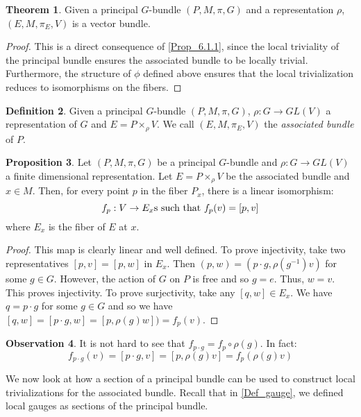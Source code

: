\documentclass[12pt,a4paper]{report}
\theoremstyle{definition}
\newtheorem{Def}{Definition}[chapter]
\theoremstyle{Theorem}
\newtheorem{Theo}[Def]{Theorem}
\newtheorem{Prop}[Def]{Proposition}
\theoremstyle{definition}
\theoremstyle{definition}
\newtheorem{Obs}[Def]{Observation}
\begin{document}
	\begin{Theo}
		Given a principal $G$-bundle $(P,M,\pi,G)$ and a representation $\rho$, $(E,M,\pi_E,V)$ is a vector bundle.
	\end{Theo}
	\begin{proof}
		\begin{comment}
			The proof follows from proposition \ref{Prop_6.1.1}. In fact the principal bundle is locally trivial and this implies that the associated bundle is locally trivial as well, with fiber $V$
		\end{comment}
		This is a direct consequence of \ref{Prop_6.1.1}, since the local triviality of the principal bundle ensures the associated bundle to be locally trivial. Furthermore, the structure of $\phi$ defined above ensures that the local trivialization reduces to isomorphisms on the fibers.
	\end{proof}
	\begin{Def}
		Given a principal $G$-bundle $(P,M,\pi,G)$, $\rho:G\rightarrow GL(V)$ a representation of $G$ and $E=P\times_\rho V$. We call $(E,M,\pi_E,V)$ the \textit{associated bundle} of $P$.
	\end{Def}
	\begin{Prop}\label{Prop_6.2.2}
		Let $(P,M,\pi,G)$ be a principal $G$-bundle and $\rho:G\rightarrow GL(V)$ a finite dimensional representation. Let $E=P\times_\rho V$ be the associated bundle and $x\in M$. Then, for every point $p$ in the fiber $P_x$, there is a linear isomorphism:
		$$f_p:V\rightarrow E_x \hbox{s such that }f_p(v)=[p,v]$$ 
		where $E_x$ is the fiber of $E$ at $x$.
	\end{Prop}
	\begin{proof}
		This map is clearly linear and well defined. To prove injectivity, take two representatives $[p,v]=[p,w]$ in $E_x$. Then $(p,w)=(p\cdot g,\rho(g^{-1})v)$ for some $g\in G$. However, the action of $G$ on $P$ is free and so $g=e$. Thus, $w=v$. This proves injectivity. To prove surjectivity, take any $[q,w]\in E_x$. We have $q=p\cdot g$ for some $g\in G$ and so we have $[q,w]=[p\cdot g,w]=[p,\rho(g)w])=f_p(v)$.
	\end{proof}
	\begin{Obs}\label{Obs_6.2.3}
		It is not hard to see that $f_{p\cdot g}=f_p\circ \rho(g)$. In fact:
		$$f_{p\cdot g}(v)=[p\cdot g,v]=[p,\rho(g)v]=f_p(\rho(g)v)$$
	\end{Obs}
	We now look at how a section of a principal bundle can be used to construct local trivializations for the associated bundle. Recall that in \ref{Def_gauge}, we defined local gauges as sections of the principal bundle.
\end{document}
